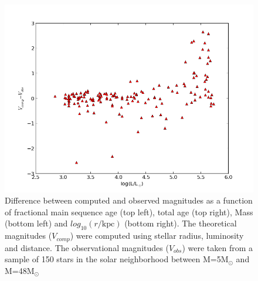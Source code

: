 \documentclass[a4paper,10pt]{article}
\begin{document}
\begin{figure}[h!]
\begin{minipage}{0.49\textwidth}
  \end{minipage}
  \begin{minipage}{0.49\textwidth}
   \includegraphics[width=\textwidth]{diffmaglogL}
  \end{minipage}
 \caption{Difference between computed and observed magnitudes as a function of fractional main sequence age (top left), total age
 (top right), Mass (bottom left) and $log_{10}(r/\mathrm{kpc})$ (bottom right). 
 The theoretical magnitudes ($V_{comp}$) were computed using stellar radius, luminosity and distance. The observational magnitudes ($V_{obs}$)
 were taken from a sample of 150 stars in the solar neighborhood between M=5M$_\odot$ and M=48M$_\odot$ \label{diffmag}}
 \end{figure}
 
\end{document}
